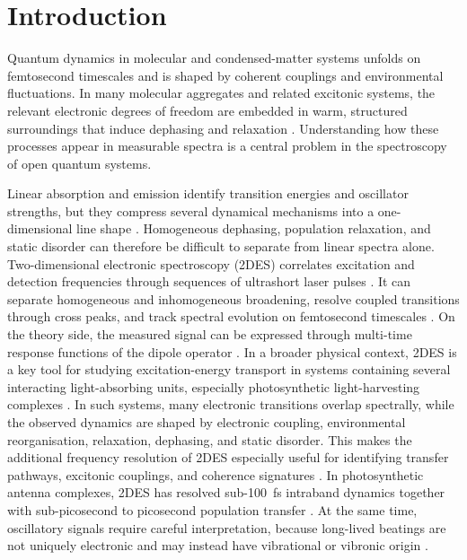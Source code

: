 \chapter{Introduction}
\label{Chapter_Introduction}
Quantum dynamics in molecular and condensed-matter systems unfolds on
femtosecond timescales and is shaped by coherent couplings and
environmental fluctuations. In many molecular aggregates and related
excitonic systems, the relevant electronic degrees of freedom are embedded
in warm, structured surroundings that induce dephasing and relaxation
\cite{breuerpetruccione2007theoryopenquantum,
weiss2012quantumdissipativesystems}.
Understanding how these processes appear in measurable spectra is a central
problem in the spectroscopy of open quantum systems.

Linear absorption and emission identify transition energies and oscillator
strengths, but they compress several dynamical mechanisms into a
one-dimensional line shape \cite{mukamel1995principlesnonlinearoptical}.
Homogeneous dephasing, population relaxation, and static disorder can
therefore be difficult to separate from linear spectra alone.
Two-dimensional electronic spectroscopy (2DES) correlates excitation and
detection frequencies through sequences of ultrashort laser pulses
\cite{jonas2003twodimensionalfemtosecondspectroscopy,
gelzinisetal2019twodimensionalspectroscopynonspecialists}. It can separate
homogeneous and inhomogeneous broadening, resolve coupled transitions
through cross peaks, and track spectral evolution on femtosecond timescales
\cite{cho2009twodimensionalopticalspectroscopy}. On the theory side, the
measured signal can be expressed through multi-time response functions of
the dipole operator
\cite{mukamel1995principlesnonlinearoptical}.
In a broader physical context, 2DES is a key tool for studying
excitation-energy transport in systems containing several interacting
light-absorbing units, especially photosynthetic light-harvesting complexes
\cite{schlau-cohenetal2011twodimensionalelectronicspectroscopy,
lambrevetal2020insightsmechanismsdynamics}. In such systems, many
electronic transitions overlap spectrally, while the observed dynamics are
shaped by electronic coupling, environmental reorganisation, relaxation,
dephasing, and static disorder. This makes the additional frequency
resolution of 2DES especially useful for identifying transfer pathways,
excitonic couplings, and coherence signatures
\cite{schlau-cohenetal2011twodimensionalelectronicspectroscopy}. In
photosynthetic antenna complexes, 2DES has resolved
sub-\SI{100}{\femto\second} intraband dynamics together with
sub-picosecond to picosecond population transfer
\cite{zigmantasetal2006twodimensionalelectronicspectroscopy}. At the
same time, oscillatory signals require careful interpretation, because
long-lived beatings are not uniquely electronic and may instead have
vibrational or vibronic origin
\cite{lambrevetal2020insightsmechanismsdynamics}.

